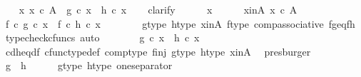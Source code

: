 \begin{isabellebody}
\isanewline
\ \ \isamarkupfalse%
\ {\isachardoublequoteopen}{\isasymforall}x{\isachardot}{\kern0pt}\ x\ {\isasymin}\isactrlsub c\ A\ {\isasymlongrightarrow}\ g\ {\isasymcirc}\isactrlsub c\ x\ {\isacharequal}{\kern0pt}\ h\ {\isasymcirc}\isactrlsub c\ x{\isachardoublequoteclose}\isanewline
\ \ \isamarkupfalse%
\ clarify\isanewline
\ \ \ \ \isamarkupfalse%
\ x\isanewline
\ \ \ \ \isamarkupfalse%
\ x{\isacharunderscore}{\kern0pt}in{\isacharunderscore}{\kern0pt}A{\isacharcolon}{\kern0pt}\ {\isachardoublequoteopen}x\ {\isasymin}\isactrlsub c\ A{\isachardoublequoteclose}\isanewline
\isanewline
\ \ \ \ \isamarkupfalse%
\ {\isachardoublequoteopen}f\ {\isasymcirc}\isactrlsub c\ g\ {\isasymcirc}\isactrlsub c\ x\ {\isacharequal}{\kern0pt}\ f\ {\isasymcirc}\isactrlsub c\ h\ {\isasymcirc}\isactrlsub c\ x{\isachardoublequoteclose}\isanewline
\ \ \ \ \ \ \isamarkupfalse%
\ g{\isacharunderscore}{\kern0pt}type\ h{\isacharunderscore}{\kern0pt}type\ x{\isacharunderscore}{\kern0pt}in{\isacharunderscore}{\kern0pt}A\ f{\isacharunderscore}{\kern0pt}type\ comp{\isacharunderscore}{\kern0pt}associative{}\ fg{\isacharunderscore}{\kern0pt}eq{\isacharunderscore}{\kern0pt}fh\ \isamarkupfalse%
\ {\isacharparenleft}{\kern0pt}typecheck{\isacharunderscore}{\kern0pt}cfuncs{\isacharcomma}{\kern0pt}\ auto{\isacharparenright}{\kern0pt}\isanewline
\ \ \ \ \isamarkupfalse%
\ \isamarkupfalse%
\ {\isachardoublequoteopen}g\ {\isasymcirc}\isactrlsub c\ x\ {\isacharequal}{\kern0pt}\ h\ {\isasymcirc}\isactrlsub c\ x{\isachardoublequoteclose}\isanewline
\ \ \ \ \ \ \isamarkupfalse%
\ cd{\isacharunderscore}{\kern0pt}h{\isacharunderscore}{\kern0pt}eq{\isacharunderscore}{\kern0pt}d{\isacharunderscore}{\kern0pt}f\ cfunc{\isacharunderscore}{\kern0pt}type{\isacharunderscore}{\kern0pt}def\ comp{\isacharunderscore}{\kern0pt}type\ f{\isacharunderscore}{\kern0pt}inj\ g{\isacharunderscore}{\kern0pt}type\ h{\isacharunderscore}{\kern0pt}type\ x{\isacharunderscore}{\kern0pt}in{\isacharunderscore}{\kern0pt}A\ \isamarkupfalse%
\ presburger\isanewline
\ \ \isamarkupfalse%
\isanewline
\ \ \isamarkupfalse%
\ \isamarkupfalse%
\ {\isachardoublequoteopen}g\ {\isacharequal}{\kern0pt}\ h{\isachardoublequoteclose}\isanewline
\ \ \ \ \isamarkupfalse%
\ g{\isacharunderscore}{\kern0pt}type\ h{\isacharunderscore}{\kern0pt}type\ one{\isacharunderscore}{\kern0pt}separator\ \isamarkupfalse%

\end{isabellebody}
